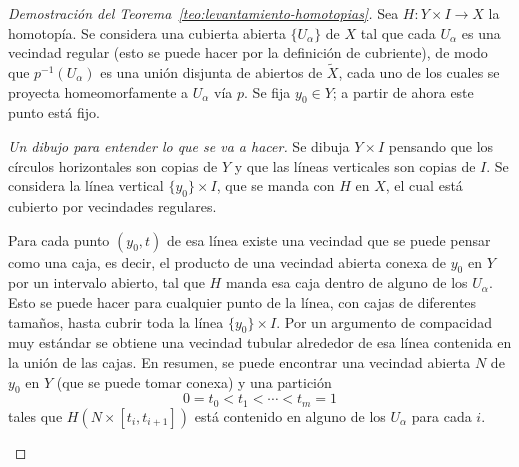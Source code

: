 \documentclass[11pt]{article}
\begin{document}
\begin{proof}[Demostración del Teorema~\ref{teo:levantamiento-homotopias}]
Sea $H\colon Y\times I\to X$ la homotopía. Se considera una cubierta abierta $\{U_\alpha\}$ de $X$ tal que cada $U_\alpha$ es una vecindad regular (esto se puede hacer por la definición de cubriente), de modo que $p^{-1}(U_\alpha)$ es una unión disjunta de abiertos de $\tilde X$, cada uno de los cuales se proyecta homeomorfamente a $U_\alpha$ vía $p$. Se fija $y_0\in Y$; a partir de ahora este punto está fijo.

\medskip\noindent\emph{Un dibujo para entender lo que se va a hacer.} Se dibuja $Y\times I$ pensando que los círculos horizontales son copias de $Y$ y que las líneas verticales son copias de $I$. Se considera la línea vertical $\{y_0\}\times I$, que se manda con $H$ en $X$, el cual está cubierto por vecindades regulares.

Para cada punto $(y_0,t)$ de esa línea existe una vecindad que se puede pensar como una caja, es decir, el producto de una vecindad abierta conexa de $y_0$ en $Y$ por un intervalo abierto, tal que $H$ manda esa caja dentro de alguno de los $U_\alpha$. Esto se puede hacer para cualquier punto de la línea, con cajas de diferentes tamaños, hasta cubrir toda la línea $\{y_0\}\times I$. Por un argumento de compacidad muy estándar se obtiene una vecindad tubular alrededor de esa línea contenida en la unión de las cajas. En resumen, se puede encontrar una vecindad abierta $N$ de $y_0$ en $Y$ (que se puede tomar conexa) y una partición
\[
  0=t_0<t_1<\cdots<t_m=1
\]
tales que $H(N\times[t_i,t_{i+1}])$ está contenido en alguno de los $U_\alpha$ para cada $i$.

\begin{center}
\end{center}


\end{proof}
\end{document}

